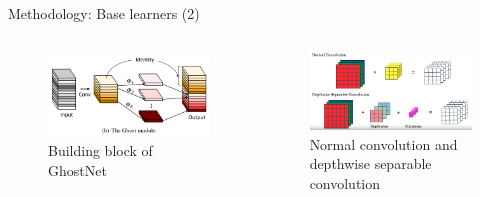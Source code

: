 \documentclass{cubeamer}
\begin{document}
\begin{frame}{Methodology: Base learners (2)}
    \vspace{0.2cm}
    \begin{columns}
        \begin{column}{0.5\textwidth}
            \begin{center}
                \begin{figure}
                    \centering
                    \includegraphics[width=0.9\columnwidth]{figures/ghost_module.png}
                    \caption{Building block of GhostNet \cite{ghostnet}}
                \end{figure}
            \end{center}
        \end{column}
        \begin{column}{0.5\textwidth}
            \begin{center}
                \begin{figure}
                    \centering
                    \includegraphics[width=0.9\columnwidth]{figures/DSconv.PNG}
                    \vspace{0.1cm}
                    \caption{Normal convolution and depthwise separable convolution \cite{coursera}}
                \end{figure}
            \end{center}
        \end{column}
    \end{columns}
\end{frame}
\end{document}

